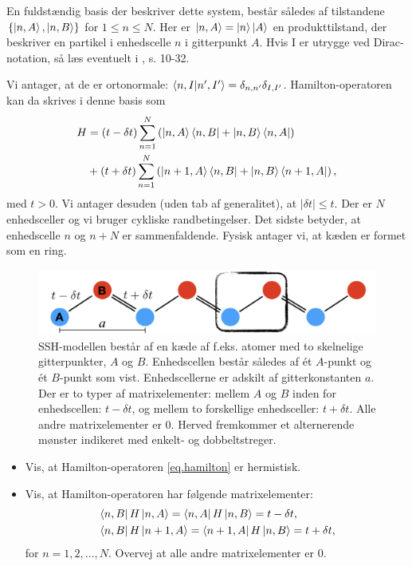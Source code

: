 \documentclass[11pt, a4paper]{article}
\begin{document}
En fuldstændig basis der beskriver dette system, består således af tilstandene $\{\ket{n, A}, \ket{n, B}\}$ for $1 \leq n \leq N$. Her er $\ket{n, A} = \ket{n}\ket{A}$ en produkttilstand, der beskriver en partikel i enhedscelle $n$ i gitterpunkt $A$. Hvis I er utrygge ved Dirac-notation, så læs eventuelt i \cite{Sakurai}, s. 10-32. 

Vi antager, at de er ortonormale: $\braket{n, I | n', I'} = \delta_{n, n'}\delta_{I, I'}$. Hamilton-operatoren kan da skrives i denne basis som 
\begin{align}
H &= (t - \delta t) \sum_{n = 1}^N\left(\ket{n, A}\bra{n, B} + \ket{n, B}\bra{n, A}\right) \nonumber \\
&+ (t + \delta t) \sum_{n = 1}^N\left(\ket{n + 1, A}\bra{n, B} + \ket{n, B}\bra{n + 1, A}\right),
\label{eq.hamilton}
\end{align}
med $t > 0$. Vi antager desuden (uden tab af generalitet), at $|\delta t| \leq t$. Der er $N$ enhedsceller og vi bruger cykliske randbetingelser. Det sidste betyder, at enhedscelle $n$ og $n + N$ er sammenfaldende. Fysisk antager vi, at kæden er formet som en ring.

\begin{figure}
\begin{center}
\includegraphics[width=1\textwidth]{SSH_model.pdf} 
\caption{SSH-modellen består af en kæde af f.eks. atomer med to skelnelige gitterpunkter, $A$ og $B$. Enhedscellen består således af ét $A$-punkt og ét $B$-punkt som vist. Enhedscellerne er adskilt af gitterkonstanten $a$. Der er to typer af matrixelementer: mellem $A$ og $B$ inden for enhedscellen: $t - \delta t$, og mellem to forskellige enhedsceller: $t + \delta t$. Alle andre matrixelementer er 0. Herved fremkommer et alternerende mønster indikeret med enkelt- og dobbeltstreger.}
\label{fig.SSH_model}
\end{center}
\end{figure}

\begin{itemize}
	\item Vis, at Hamilton-operatoren \eqref{eq.hamilton} er hermistisk. 

	\item Vis, at Hamilton-operatoren har følgende matrixelementer: 
	\begin{align}
	&\bra{n, B} H \ket{n, A} = \bra{n, A} H \ket{n, B} = t - \delta t, \nonumber \\
	&\bra{n, B} H \ket{n + 1, A} = \bra{n + 1, A} H \ket{n, B} = t + \delta t, \nonumber
	\end{align} 
	for $n = 1, 2, \dots, N$. Overvej at alle andre matrixelementer er 0. 
\end{itemize} 
\end{document}
